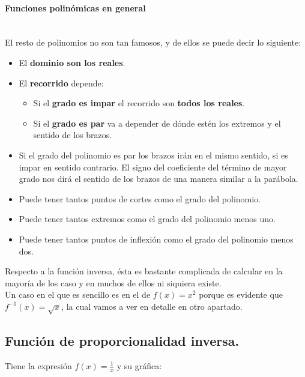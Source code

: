 \documentclass[a4paper,11pt,answers]{exam}
\begin{document}
\paragraph{Funciones polinómicas en general}\mbox{}\\
El resto de polinomios no son tan famosos, y de ellos se puede decir lo siguiente:
\begin{itemize}
	\item El \textbf{dominio son los reales}.
	\item El \textbf{recorrido} depende:
	\begin{itemize}
		\item Si el \textbf{grado es impar} el recorrido son \textbf{todos los reales}.
		\item Si el \textbf{grado es par} va a depender de dónde estén los extremos y el sentido de los brazos.
	\end{itemize}
	\item Si el grado del polinomio es par los brazos irán en el mismo sentido, si es impar en sentido contrario. El signo del coeficiente del término de mayor grado nos dirá el sentido de los brazos de una manera similar a la parábola.
	\item Puede tener tantos puntos de cortes como el grado del polinomio.
	\item Puede tener tantos extremos como el grado del polinomio menos uno.
	\item Puede tener tantos puntos de inflexión como el grado del polinomio menos dos.
\end{itemize}

Respecto a la función inversa, ésta es bastante complicada de calcular en la mayoría de los caso y en muchos de ellos ni siquiera existe.\\
Un caso en el que es sencillo es en el de $f(x) = x^2$ porque es evidente que $f^{-1}(x) = \sqrt{x}$, la cual vamos a ver en detalle en otro apartado.

\subsection{Función de proporcionalidad inversa.}
Tiene la expresión $f(x) = \frac{1}{x}$ y su gráfica:
\begin{center}
\end{center}
\end{document}

